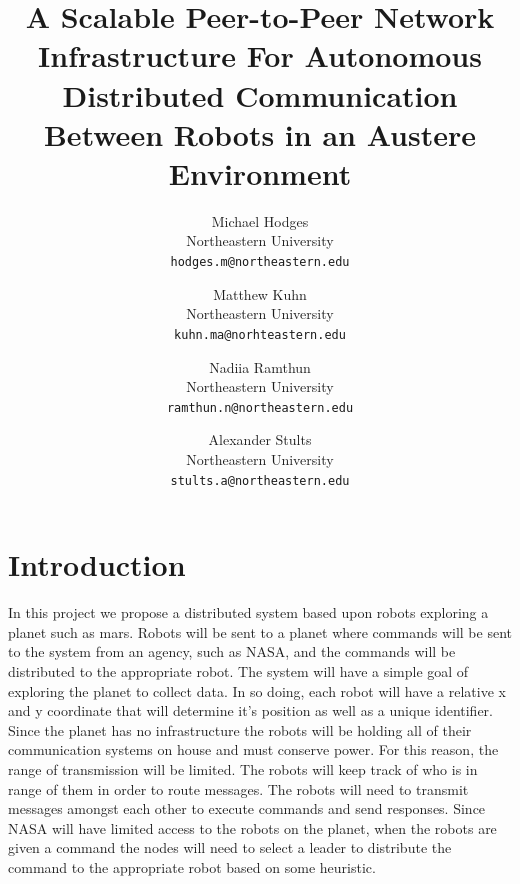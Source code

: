 \documentclass[10pt,letterpaper]{article}
\begin{document}
\title{A Scalable Peer-to-Peer Network Infrastructure For Autonomous Distributed Communication Between Robots in an Austere Environment}

\author{Michael Hodges\\
Northeastern University\\
{\tt\small hodges.m@northeastern.edu}
\and 
Matthew Kuhn\\
Northeastern University\\
{\tt\small kuhn.ma@norhteastern.edu}
\and
Nadiia Ramthun\\
Northeastern University\\
{\tt\small ramthun.n@northeastern.edu}
\and
Alexander Stults\\
Northeastern University\\
{\tt\small stults.a@northeastern.edu}
}

\maketitle

\section{Introduction}
In this project we propose a distributed system based upon robots exploring a planet such as mars. Robots will be sent to a planet where commands will be sent to the system from an agency, such as NASA, and the commands will be distributed to the appropriate robot. The system will have a simple goal of exploring the planet to collect data. In so doing, each robot will have a relative x and y coordinate that will determine it's position as well as a unique identifier. Since the planet has no infrastructure the robots will be holding all of their communication systems on house and must conserve power. For this reason, the range of transmission will be limited. The robots will keep track of who is in range of them in order to route messages. The robots will need to transmit messages amongst each other to execute commands and send responses. Since NASA will have limited access to the robots on the planet, when the robots are given a command the nodes will need to select a leader to distribute the command to the appropriate robot based on some heuristic.
\end{document}
